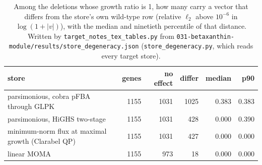 \begin{table}[H]
  \centering
  \footnotesize
  \caption[Degeneracy of the stores]{Among the deletions whose growth ratio is 1, how many carry a vector that differs from the store's own wild-type row (relative $\ell_2$ above $10^{-6}$ in $\log(1+|v|)$), with the median and ninetieth percentile of that distance. Written by \texttt{target\_notes\_tex\_tables.py} from \texttt{031-betaxanthin-module/results/store\_degeneracy.json} (\texttt{store\_degeneracy.py}, which reads every target store).}
  \label{tab:store-degeneracy}
  \begin{tabular}{@{}lrrrrr@{}}
    \hline
    store & genes & no effect & differ & median & p90 \\
    \hline
    parsimonious, cobra pFBA through GLPK & 1155 & 1031 & 1025 & 0.383 & 0.383 \\
    parsimonious, HiGHS two-stage & 1155 & 1031 & 428 & 0.000 & 0.390 \\
    minimum-norm flux at maximal growth (Clarabel QP) & 1155 & 1031 & 427 & 0.000 & 0.000 \\
    linear MOMA & 1155 & 973 & 18 & 0.000 & 0.000 \\
    \hline
  \end{tabular}
\end{table}

